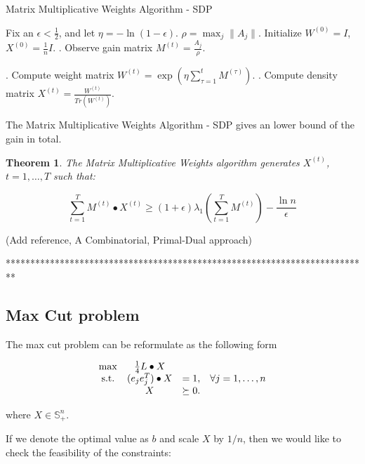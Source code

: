\documentclass[12pt]{article}
\newtheorem{theorem}{Theorem}
\begin{document}
\begin{algorithm}\label{MMWfeasibility}
   \caption{Matrix Multiplicative Weights Algorithm - SDP}
    \begin{algorithmic}[]
      \State Fix an $\epsilon < \frac{1}{2}$, and let $\eta = -\ln(1-\epsilon)$. $\rho = \max_j\|A_j\|$. 
      \State Initialize $W^{(0)} = I$, $X^{(0)} = \frac{1}{n}I$.
    . Observe gain matrix $M^{(t)} = \frac{A_j}{\rho}$.
    
    . Compute weight matrix $W^{(t)} = \exp(\eta\sum_{\tau =1 }^t M^{(\tau)})$.
    . Compute density matrix $X^{(t)} = \frac{W^{(t)}}{Tr(W^{(t)})}$.
     \EndWhile
\end{algorithmic}
\end{algorithm}

The Matrix Multiplicative Weights Algorithm - SDP gives an lower bound of the gain in total.

\begin{theorem}

The Matrix Multiplicative Weights algorithm generates $X^{(t)}$, $t = 1, \dots, T$ such that:

$$
\sum_{t=1}^TM^{(t)} \bullet X^{(t)} \geqslant (1 + \epsilon) \lambda_1\left(\sum_{t=1}^T M^{(t)}\right) - \frac{\ln n}{\epsilon} 
$$
\end{theorem}

(Add reference, A Combinatorial, Primal-Dual approach)

**************************************************************************


\subsection{Max Cut problem}

The max cut problem can be reformulate as the following form

\begin{equation}\label{Originalproblem}
\begin{array}{c c c c}
\max & \frac{1}{4} L \bullet X &  & \\
\text{s.t.} & (e_je_j^T) \bullet X  & =  1,  & \forall j = 1,\dots, n \\ 
 & X  & \succeq  0. &
\end{array}
\end{equation}

where $X\in \mathbb S_+^n$.

If we denote the optimal value as $b$ and scale $X$ by $1/n$, then we would like to check the feasibility of the constraints: 
\end{document}
